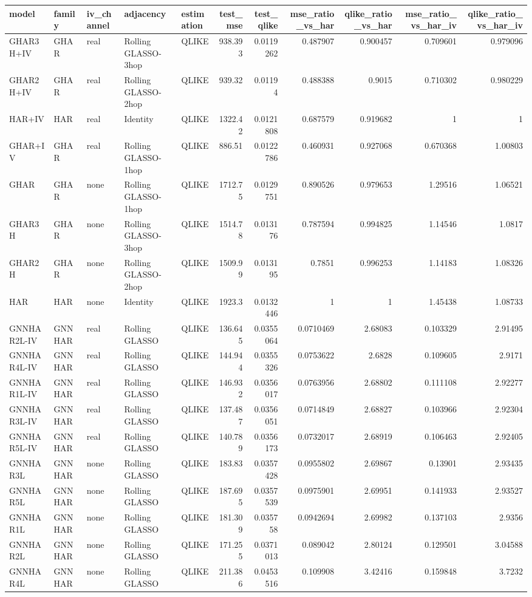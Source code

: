 \begin{tabular}{lllllrrrrrr}
\toprule
model & family & iv_channel & adjacency & estimation & test_mse & test_qlike & mse_ratio_vs_har & qlike_ratio_vs_har & mse_ratio_vs_har_iv & qlike_ratio_vs_har_iv \\
\midrule
GHAR3H+IV & GHAR & real & Rolling GLASSO-3hop & QLIKE & 938.393 & 0.0119262 & 0.487907 & 0.900457 & 0.709601 & 0.979096 \\
GHAR2H+IV & GHAR & real & Rolling GLASSO-2hop & QLIKE & 939.32 & 0.01194 & 0.488388 & 0.9015 & 0.710302 & 0.980229 \\
HAR+IV & HAR & real & Identity & QLIKE & 1322.42 & 0.0121808 & 0.687579 & 0.919682 & 1 & 1 \\
GHAR+IV & GHAR & real & Rolling GLASSO-1hop & QLIKE & 886.51 & 0.0122786 & 0.460931 & 0.927068 & 0.670368 & 1.00803 \\
GHAR & GHAR & none & Rolling GLASSO-1hop & QLIKE & 1712.75 & 0.0129751 & 0.890526 & 0.979653 & 1.29516 & 1.06521 \\
GHAR3H & GHAR & none & Rolling GLASSO-3hop & QLIKE & 1514.78 & 0.013176 & 0.787594 & 0.994825 & 1.14546 & 1.0817 \\
GHAR2H & GHAR & none & Rolling GLASSO-2hop & QLIKE & 1509.99 & 0.013195 & 0.7851 & 0.996253 & 1.14183 & 1.08326 \\
HAR & HAR & none & Identity & QLIKE & 1923.3 & 0.0132446 & 1 & 1 & 1.45438 & 1.08733 \\
GNNHAR2L-IV & GNNHAR & real & Rolling GLASSO & QLIKE & 136.645 & 0.0355064 & 0.0710469 & 2.68083 & 0.103329 & 2.91495 \\
GNNHAR4L-IV & GNNHAR & real & Rolling GLASSO & QLIKE & 144.944 & 0.0355326 & 0.0753622 & 2.6828 & 0.109605 & 2.9171 \\
GNNHAR1L-IV & GNNHAR & real & Rolling GLASSO & QLIKE & 146.932 & 0.0356017 & 0.0763956 & 2.68802 & 0.111108 & 2.92277 \\
GNNHAR3L-IV & GNNHAR & real & Rolling GLASSO & QLIKE & 137.487 & 0.0356051 & 0.0714849 & 2.68827 & 0.103966 & 2.92304 \\
GNNHAR5L-IV & GNNHAR & real & Rolling GLASSO & QLIKE & 140.789 & 0.0356173 & 0.0732017 & 2.68919 & 0.106463 & 2.92405 \\
GNNHAR3L & GNNHAR & none & Rolling GLASSO & QLIKE & 183.83 & 0.0357428 & 0.0955802 & 2.69867 & 0.13901 & 2.93435 \\
GNNHAR5L & GNNHAR & none & Rolling GLASSO & QLIKE & 187.695 & 0.0357539 & 0.0975901 & 2.69951 & 0.141933 & 2.93527 \\
GNNHAR1L & GNNHAR & none & Rolling GLASSO & QLIKE & 181.309 & 0.035758 & 0.0942694 & 2.69982 & 0.137103 & 2.9356 \\
GNNHAR2L & GNNHAR & none & Rolling GLASSO & QLIKE & 171.255 & 0.0371013 & 0.089042 & 2.80124 & 0.129501 & 3.04588 \\
GNNHAR4L & GNNHAR & none & Rolling GLASSO & QLIKE & 211.386 & 0.0453516 & 0.109908 & 3.42416 & 0.159848 & 3.7232 \\
\bottomrule
\end{tabular}

